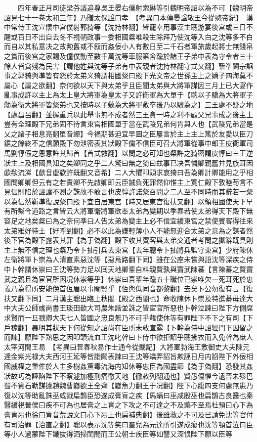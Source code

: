 　　四年春正月司徒梁芬議追尊吳王晏右僕射索綝等引魏明帝詔以為不可【魏明帝詔見七十一卷太和三年】乃贈太保諡曰孝　【考異曰本傳晏諡敬王今從愍帝紀】　漢中常侍王沈宣懷中宫僕射郭猗等【沈持林翻】皆寵幸用事漢主聰游宴後宫或三日不醒或百日不出自去冬不視朝政事一委相國粲唯殺生除拜乃使沈等入白之沈等多不白而自以其私意决之故勲舊或不叙而姦佞小人有數日至二千石者軍旅歲起將士無錢帛之賞而後宫之家賜及僮僕動至數千萬沈等車服第舍踰於諸王子弟中表為守令者三十餘人皆貪殘為民害【謂他姓與沈等子弟有中表親者沈持林翻守式又翻】靳凖闔宗諂事之郭猗與凖皆有怨於太弟义猗謂相國粲曰殿下光文帝之世孫主上之嫡子四海莫不屬心【屬之欲翻】奈何欲以天下與太弟乎且臣聞太弟與大將軍謀因三月上已大宴作亂事成許以主上為太上皇大將軍為皇太子又許衛軍為大單于【聰以子驥為大將軍子勱為衛大將軍皆粲弟也又按時以子敷為大將軍敷卒後乃以驥為之】三王處不疑之地【處昌呂翻】並握重兵以此舉事無不成者然三王貪一時之利不顧父兄事成之後主上豈有全理殿下兄弟固不待言東宫相國單于當在武陵兄弟何肯與人也【武陵兄弟當是乂之諸子相息亮翻單音蟬】今禍期甚迫宜早圖之臣屢言於主上主上篤於友愛以臣刀鋸之餘終不之信願殿下勿泄密表其狀殿下儻不信臣可召大將軍從事中郎王皮衛軍司馬劉惇假之恩意許其歸首【首式救翻】以問之必可知也粲許之猗密謂皮惇曰三王逆狀主上及相國具知之矣卿同之乎二人驚曰無之猗曰兹事已决吾憐卿親舊并見族耳因歔欷流涕【歔音虚欷許既翻又音希】二人大懼叩頭求哀猗曰吾為卿計卿能用之乎相國問卿卿但云有之若責卿不先啟卿即云臣誠負死罪然仰惟主上寛仁殿下敦睦苟言不見信則陷於誣譖不測之誅故不敢言也皮惇許諾粲召問之二人至不同時而其辭若一粲以為信然靳凖復說粲曰殿下宜自居東宫【時又居東宫復扶又翻】以領相國使天下早有所繫今道路之言皆云大將軍衛將軍欲奉太弟為變期以季春若使太弟得天下殿下無容足之地矣粲曰為之奈何凖曰人告太弟為變主上必不信宜緩東宫之禁使賓客得往來太弟雅好待士【好呼到翻】必不以此為嫌輕薄小人不能無迎合太弟之意為之謀者然後下官為殿下露表其罪【為于偽翻】殿下收其賓客與太弟交通者考問之獄辭既具則主上無不信之理也粲乃令卜抽引兵去東宫【去年聰令卜抽將兵監守東宫】少府陳休左衛將軍卜崇為人清直素惡沈等【惡烏路翻下同】雖在公座未嘗與語沈等深疾之侍中卜幹謂休崇曰王沈等勢力足以囘天地卿輩自料親賢孰與竇武陳蕃【言陳蕃之賢竇武之親且為宦官所困况休崇等乎】休崇曰吾輩年踰五十職位已崇唯欠一死耳死於忠義乃為得所安能俛首仾眉以事閹豎乎【仾與低同音都黎翻】去矣卜公勿復有言【復扶又翻下同】二月漢主聰出臨上秋閤【殿之西閤也】命收陳休卜崇及特進綦毋達大中大夫公師彧尚書王琰田歆大司農朱諧並誅之皆宦官所惡也卜幹泣諫曰陛下方側席求賢而一旦戮卿大夫七人皆國之忠良無乃不可乎藉使休等有罪陛下不下之有司【下戶稼翻】暴明其狀天下何從知之詔尚在臣所未敢宣露【卜幹為侍中詔經門下因留之而諫】願陛下熟思之因叩頭流血王沈叱幹曰卜侍中欲拒詔乎聰拂衣而入免幹為庶人太宰河間王易　【考異曰晉春秋易作士通今從載記】大將軍勃海王敷御史大夫陳元達金紫光禄大夫西河王延等皆詣闕表諫曰王沈等矯弄詔旨欺誣日月内諂陛下外佞相國威權之重侔於人主多樹姦黨毒流海内知休等忠臣為國盡節【為于偽翻】恐發其姦狀故巧為誣陷陛下不察遽加極刑痛徹天地【徹敕列翻通也】賢愚傷懼今遺晉未殄巴蜀不賓石勒謀據趙魏曹嶷欲王全齊【嶷魚力翻王于况翻】陛下心腹四支何處無患乃復以沈等助亂誅巫咸戮扁鵲臣恐遂成膏肓之疾【馬螎曰巫咸殷巫也扁鵲古良醫也秦醫緩視晉侯曰疾不可為也居膏之上肓之下攻之不可達之不及藥不至焉杜預曰心下為膏肓鬲也徐曰肓音荒說文曰心下鬲上也扁補典翻】後雖救之不可及已請免沈等官付有司治罪【治直之翻】聰以表示沈等笑曰羣兒為元達所引遂成癡也沈等頓首泣曰臣等小人過蒙陛下識抜得洒掃閨閤而王公朝士疾臣等如讐又深恨陛下願以臣等